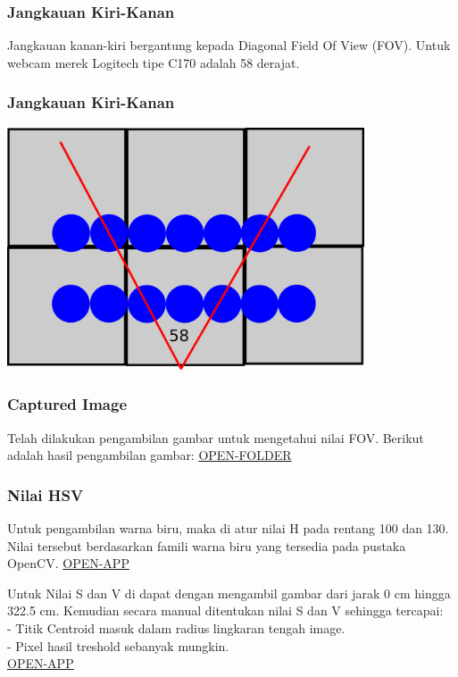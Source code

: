 \documentclass[table,dvipsnames]{beamer}
\begin{document}
\begin{frame}
 \frametitle{Jangkauan Kiri-Kanan}
 \begin{block}{}
  Jangkauan kanan-kiri bergantung kepada Diagonal Field Of View (FOV).
  Untuk webcam merek Logitech tipe C170 adalah 58 derajat.
 \end{block}
\end{frame}

\begin{frame}
 \frametitle{Jangkauan Kiri-Kanan}
 \begin{center}
 \includegraphics[width=300pt]{./fov/fov}
\end{center}
 \begin{block}

 \end{block}
\end{frame}

\begin{frame}
 \frametitle{Captured Image}
  \begin{block}{}
  Telah dilakukan pengambilan gambar untuk mengetahui nilai FOV.
  Berikut adalah hasil pengambilan gambar: \url{OPEN-FOLDER}
 \end{block}
\end{frame}

\begin{frame}
 \frametitle{Nilai HSV}
 \begin{block}{}
  Untuk pengambilan warna biru, maka di atur nilai H pada rentang 100 dan 130.
  Nilai tersebut berdasarkan famili warna biru yang tersedia pada pustaka OpenCV.
  \url{OPEN-APP}
 \end{block}
  \begin{block}{}
  Untuk Nilai S dan V di dapat dengan mengambil gambar dari jarak 0 cm hingga 322.5 cm.
  Kemudian secara manual ditentukan nilai S dan V sehingga tercapai:\\
  - Titik Centroid masuk dalam radius lingkaran tengah image.\\
  - Pixel hasil treshold sebanyak mungkin.\\
   \url{OPEN-APP}
 \end{block}
\end{frame}
\end{document}
